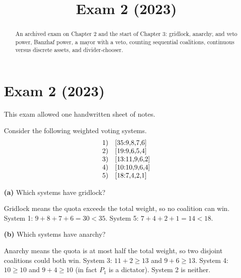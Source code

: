 \documentclass[12pt]{ximera}
\title{Exam 2 (2023)}
\begin{document}
\begin{abstract}
An archived exam on Chapter 2 and the start of Chapter 3: gridlock, anarchy, and veto power, Banzhaf power, a mayor with a veto, counting sequential coalitions, continuous versus discrete assets, and divider-chooser.
\end{abstract}
\maketitle

\section*{Exam 2 (2023)}

This exam allowed one handwritten sheet of notes.

\begin{problem}
Consider the following weighted voting systems.
\[
\begin{array}{ll}
1) & $[35:9,8,7,6]$\\
2) & $[19:9,6,5,4]$\\
3) & $[13:11,9,6,2]$\\
4) & $[10:10,9,6,4]$\\
5) & $[18:7,4,2,1]$\\
\end{array}
\]

\begin{prompt}
\textbf{(a)} Which systems have gridlock?
\begin{selectAll}
\end{selectAll}
\begin{feedback}
Gridlock means the quota exceeds the total weight, so no coalition can win.
System 1: $9+8+7+6=30<35$. System 5: $7+4+2+1=14<18$.
\end{feedback}
\end{prompt}

\begin{prompt}
\textbf{(b)} Which systems have anarchy?
\begin{selectAll}
\end{selectAll}
\begin{feedback}
Anarchy means the quota is at most half the total weight, so two disjoint coalitions
could both win. System 3: $11+2\ge13$ and $9+6\ge13$. System 4: $10\ge10$ and $9+4\ge10$ (in fact $P_1$ is a dictator). System 2 is neither.
\end{feedback}
\end{prompt}


\end{problem}
\end{document}
